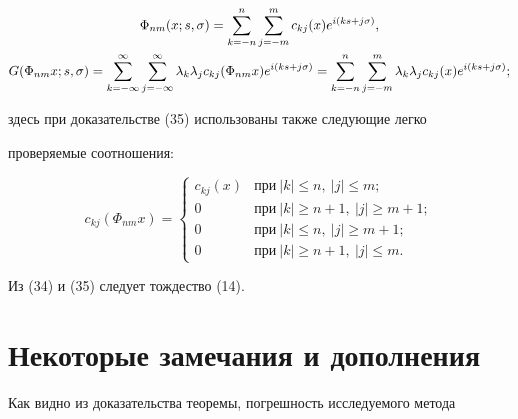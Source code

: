 \begin{pf}
\begin{gather} 


\Phi_{nm}(x;s,\sigma)=\sum^n_{k=-n}\sum^m_{j=-m} 


c_{k j}(x)e^{i(ks+j\sigma)}, \notag \\ 


% 


G(\Phi_{nm}x;s,\sigma)= 


\sum^\infty_{k=-\infty}\sum^\infty_{j=-\infty} 


\lambda_k\lambda_j c_{k j}(\Phi_{nm}x)e^{i(ks+j\sigma)}= 


\sum^n_{k=-n}\sum^m_{j=-m}\lambda_k\lambda_j c_{k j}(x) 


e^{i(ks+j\sigma)}; 


\end{gather} 


здесь при доказательстве (35) использованы также следующие легко 


проверяемые соотношения: 


$$


c_{k j}(\Phi_{nm}x)= 


\begin{cases} 


c_{k j}(x) &\text{при}\ |k|\le n,\ |j|\le m; \\ 


0 & \text{при}\ |k|\ge n+1,\ |j|\ge m+1; \\ 


0 & \text{при}\ |k|\le n,\ |j|\ge m+1;\\ 


0 & \text{при}\ |k|\ge n+1,\ |j|\le m. 


\end{cases} 


$$


Из (34) и (35) следует тождество (14). 


\end{pf} 


 


 


\section{Некоторые замечания и дополнения} 


 


Как видно из доказательства теоремы, погрешность исследуемого метода 


